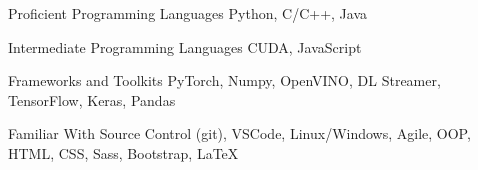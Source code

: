 
\begin{cvskills}


  \cvskill
  {Proficient Programming Languages}
  {Python, C/C++, Java}
  
  \cvskill
  {Intermediate Programming Languages}
  {CUDA, JavaScript}
  
  \cvskill
  {Frameworks and Toolkits}
  {PyTorch, Numpy, OpenVINO, DL Streamer, TensorFlow, Keras, Pandas}

  \cvskill
  {Familiar With}
  {Source Control (git), VSCode, Linux/Windows, Agile, OOP, HTML, CSS, Sass, Bootstrap, LaTeX}

\end{cvskills}
